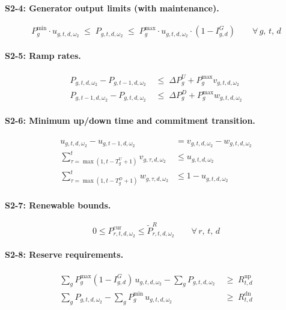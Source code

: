 \documentclass[11pt]{article}
\begin{document}
\paragraph{S2-4: Generator output limits (with maintenance).}
\begin{equation}\label{eq:s2-gen-lim}
  P^{\min}_g \cdot u_{g,t,d,\omega_2}
  \;\leq\; P_{g,t,d,\omega_2} \;\leq\;
  P^{\max}_g \cdot u_{g,t,d,\omega_2} \cdot (1 - I^{G}_{g,d})
  \qquad \forall\, g,\,t,\,d
\end{equation}

\paragraph{S2-5: Ramp rates.}
\begin{align}
  P_{g,t,d,\omega_2} - P_{g,t-1,d,\omega_2}
    &\;\leq\; \Delta P^{U}_g + P^{\max}_g v_{g,t,d,\omega_2}
    \label{eq:s2-ramp-up}\\
  P_{g,t-1,d,\omega_2} - P_{g,t,d,\omega_2}
    &\;\leq\; \Delta P^{D}_g + P^{\max}_g w_{g,t,d,\omega_2}
    \label{eq:s2-ramp-dn}
\end{align}

\paragraph{S2-6: Minimum up/down time and commitment transition.}
\begin{align}
  u_{g,t,d,\omega_2} - u_{g,t-1,d,\omega_2}
    &= v_{g,t,d,\omega_2} - w_{g,t,d,\omega_2}
    \label{eq:s2-transition}\\
  \sum_{\tau=\max(1,t-T^U_g+1)}^{t} v_{g,\tau,d,\omega_2}
    &\leq u_{g,t,d,\omega_2}
    \label{eq:s2-minup}\\
  \sum_{\tau=\max(1,t-T^D_g+1)}^{t} w_{g,\tau,d,\omega_2}
    &\leq 1 - u_{g,t,d,\omega_2}
    \label{eq:s2-mindn}
\end{align}

\paragraph{S2-7: Renewable bounds.}
\begin{equation}\label{eq:s2-re}
  0 \leq P^{\mathrm{cur}}_{r,t,d,\omega_2}
  \leq \tilde{P}^{R}_{r,t,d,\omega_2}
  \qquad \forall\, r,\,t,\,d
\end{equation}

\paragraph{S2-8: Reserve requirements.}
\begin{align}
  \sum_{g} P^{\max}_g (1-I^{G}_{g,d})\, u_{g,t,d,\omega_2}
  - \sum_{g} P_{g,t,d,\omega_2}
  &\;\geq\; R^{\mathrm{up}}_{t,d}
  \label{eq:s2-res-up}\\
  \sum_{g} P_{g,t,d,\omega_2}
  - \sum_{g} P^{\min}_g\, u_{g,t,d,\omega_2}
  &\;\geq\; R^{\mathrm{dn}}_{t,d}
  \label{eq:s2-res-dn}
\end{align}
\end{document}
